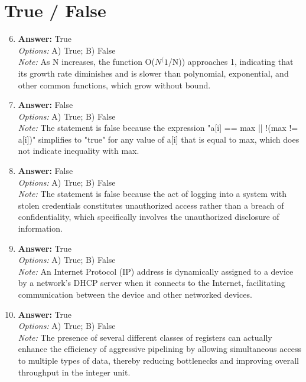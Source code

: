 \documentclass[12pt]{article}
\begin{document}
\section*{True / False}
\begin{enumerate}[label=\arabic*.]
\setcounter{enumi}{5}
\item \textbf{Answer:} True
\\ \textit{Options:} A) True; B) False
\\ \textit{Note:} As N increases, the function O($N^(1$/N)) approaches 1, indicating that its growth rate diminishes and is slower than polynomial, exponential, and other common functions, which grow without bound.
\item \textbf{Answer:} False
\\ \textit{Options:} A) True; B) False
\\ \textit{Note:} The statement is false because the expression "a[i] == max || !(max != a[i])" simplifies to "true" for any value of a[i] that is equal to max, which does not indicate inequality with max.
\item \textbf{Answer:} False
\\ \textit{Options:} A) True; B) False
\\ \textit{Note:} The statement is false because the act of logging into a system with stolen credentials constitutes unauthorized access rather than a breach of confidentiality, which specifically involves the unauthorized disclosure of information.
\item \textbf{Answer:} True
\\ \textit{Options:} A) True; B) False
\\ \textit{Note:} An Internet Protocol (IP) address is dynamically assigned to a device by a network's DHCP server when it connects to the Internet, facilitating communication between the device and other networked devices.
\item \textbf{Answer:} True
\\ \textit{Options:} A) True; B) False
\\ \textit{Note:} The presence of several different classes of registers can actually enhance the efficiency of aggressive pipelining by allowing simultaneous access to multiple types of data, thereby reducing bottlenecks and improving overall throughput in the integer unit.
\end{enumerate}
\end{document}
